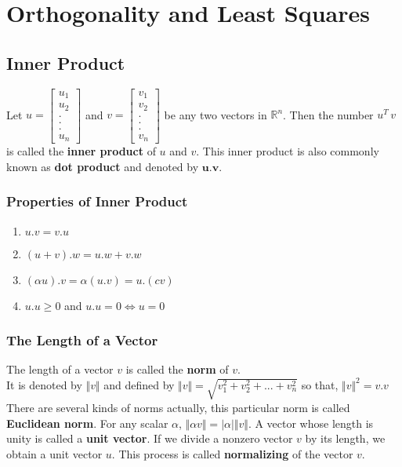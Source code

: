 \documentclass[aima104_lecturenotes_ku.tex]{subfiles}
\begin{document}
\chapter{Orthogonality and Least Squares}
\section{Inner Product}
Let $u =
\begin{bmatrix}
  u_1 \\ u_2 \\ . \\ .\\ .\\ u_n
\end{bmatrix} $ and $v =
\begin{bmatrix}
  v_1 \\ v_2 \\ . \\ .\\ .\\ v_n
\end{bmatrix} $ be any two vectors in $\mathbb{R}^n$. Then the number $u^T\, v$ is called the \textbf{inner product} of $u$ and $v$. This inner product is also commonly known as \textbf{dot product} and denoted by $\mathbf{u.v}$.

\subsection{Properties of Inner Product}
\begin{mdframed}
  \begin{enumerate}
  \item $u.v = v.u$
  \item $(u+v).w = u.w + v.w$
  \item $(\alpha u).v = \alpha (u.v) = u. (cv)$
  \item $u.u \geq 0$ and $u.u = 0 \Longleftrightarrow u=0$
  \end{enumerate}
\end{mdframed}

\subsection{The Length of a Vector}
The length of a vector $v$ is called the \textbf{norm} of $v$. \\ It is denoted by $\Vert v \Vert$ and defined by $\Vert v \Vert = \sqrt{v_1^2 + v_2^2 + ... + v_n^2} $ so that, $\Vert v \Vert ^2 = v.v$ There are several kinds of norms actually, this particular norm is called \textbf{Euclidean norm}.
For any scalar $\alpha$, $\Vert \alpha v \Vert = \vert \alpha \vert \Vert v \Vert$. A vector whose length is unity is called a \textbf{unit vector}. If we divide a nonzero vector $v$ by its length, we obtain a unit vector $u$. This process is called \textbf{normalizing} of the vector $v$.
\end{document}
